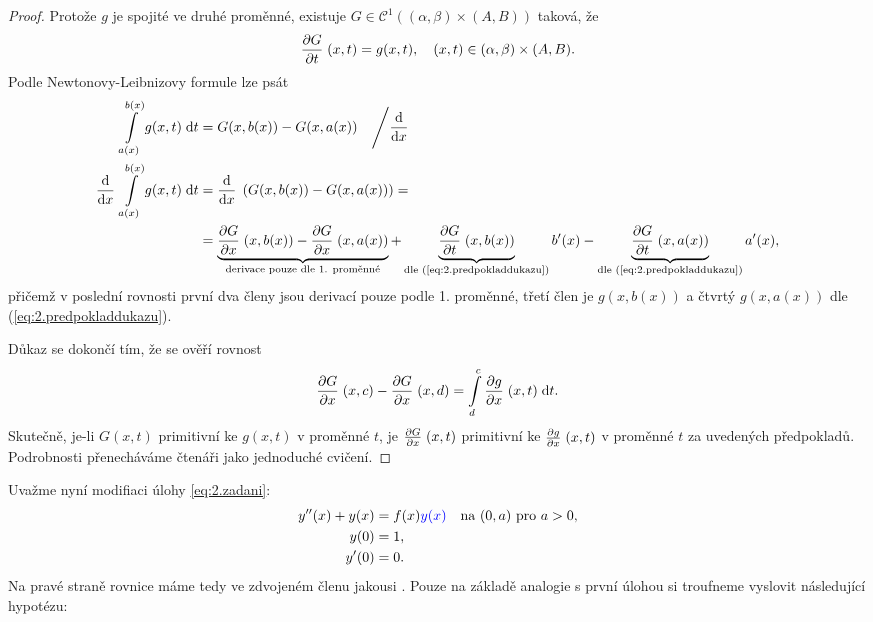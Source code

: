 \begin{proof}
Protože $g$ je spojité ve druhé proměnné, existuje $G\in \mathcal{C}^1((\alpha,\beta)\times(A,B))$ taková, že 
\begin{equation}
    \frac{\partial G}{\partial t} \;(x,t)=g(x,t),\quad (x,t)\in (\alpha,\beta)\times(A,B).
    \label{eq:2.predpokladdukazu}
\end{equation}
Podle Newtonovy-Leibnizovy formule lze psát
\begin{equation}
    \begin{split}
        \int\limits_{a(x)}^{b(x)}g(x,t)\;\mathrm{d}t &= G(x,b(x))-G(x,a(x)) \quad \Bigg/ \frac{\mathrm{d} }{\mathrm{d} x} \;\\
        \frac{\mathrm{d} }{\mathrm{d} x} \;\int\limits_{a(x)}^{b(x)}g(x,t)\;\mathrm{d}t &= \frac{\mathrm{d} }{\mathrm{d} x} \; \left(G(x,b(x))-G(x,a(x))\right) 
        = \\ &=
        \underbrace{\frac{\partial G}{\partial x} \;(x,b(x))-\frac{\partial G}{\partial x} \;(x,a(x))}_{\text{derivace pouze dle 1. proměnné}}+\underbrace{\frac{\partial G}{\partial t} \;(x,b(x))}_{\text{dle (\ref{eq:2.predpokladdukazu})}}b'(x)-\underbrace{\frac{\partial G}{\partial t} \;(x,a(x))}_{\text{dle (\ref{eq:2.predpokladdukazu})}}a'(x),
    \end{split}
\end{equation}
přičemž v poslední rovnosti první dva členy jsou derivací pouze podle 1. proměnné, třetí člen je $g(x,b(x))$ a čtvrtý $g(x,a(x))$ dle (\ref{eq:2.predpokladdukazu}).

Důkaz se dokončí tím, že se ověří rovnost
\begin{equation}
    \frac{\partial G}{\partial x} \;(x,c)-\frac{\partial G}{\partial x} \;(x,d)=\int\limits_{d}^c \frac{\partial g}{\partial x} \;(x,t)\;\mathrm{d}t.
\end{equation}
Skutečně, je-li $G(x,t)$ primitivní ke $g(x,t)$ v proměnné $t$, je $\frac{\partial G}{\partial x} \;(x,t)$ primitivní ke $\frac{\partial g}{\partial x} \;(x,t)$ v proměnné $t$ za uvedených předpokladů. Podrobnosti přenecháváme čtenáři jako jednoduché cvičení.
\end{proof}

Uvažme nyní modifiaci úlohy \eqref{eq:2.zadani}:
\begin{equation}
    \begin{split}
        y''(x)+y(x)&=f(x)\textcolor{blue}{y(x)} \quad \text{na } (0,a) \text{ pro } a>0,\\
        y(0)&=1,\\
        y'(0)&=0.
    \end{split}
    \label{eq:2.zadani_y(x)_vpravo}
\end{equation}
Na pravé straně rovnice máme tedy ve zdvojeném členu jakousi . Pouze na základě analogie s první úlohou si troufneme vyslovit následující hypotézu:

